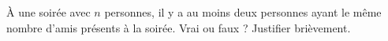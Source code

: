 \begin{exercice}\label{exoJanvier012}

À une soirée avec $n$ personnes, il y a au moins deux personnes ayant le même nombre d'amis présents à la soirée. Vrai ou faux ? Justifier brièvement.

\end{exercice}
